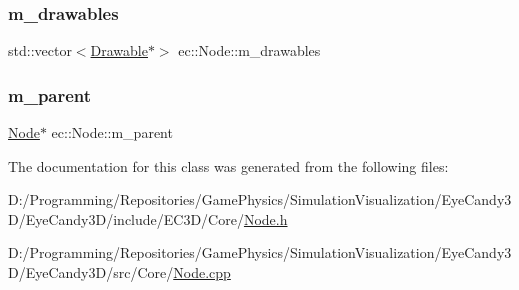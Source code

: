 \mbox{\label{classec_1_1_node_aa9f624971a4906674148117ba4442c01}} 
\subsubsection{\texorpdfstring{m\+\_\+drawables}{m\_drawables}}
{\footnotesize\ttfamily std\+::vector$<$\mbox{\hyperlink{classec_1_1_drawable}{Drawable}}$\ast$$>$ ec\+::\+Node\+::m\+\_\+drawables\hspace{0.3cm}{\ttfamily [protected]}}

\mbox{\label{classec_1_1_node_a9f5373bd3ba5bfed53894223adcfe791}} 
\subsubsection{\texorpdfstring{m\+\_\+parent}{m\_parent}}
{\footnotesize\ttfamily \mbox{\hyperlink{classec_1_1_node}{Node}}$\ast$ ec\+::\+Node\+::m\+\_\+parent\hspace{0.3cm}{\ttfamily [protected]}}



The documentation for this class was generated from the following files\+:\begin{DoxyCompactItemize}
\item 
D\+:/\+Programming/\+Repositories/\+Game\+Physics/\+Simulation\+Visualization/\+Eye\+Candy3\+D/\+Eye\+Candy3\+D/include/\+E\+C3\+D/\+Core/\mbox{\hyperlink{_node_8h}{Node.\+h}}\item 
D\+:/\+Programming/\+Repositories/\+Game\+Physics/\+Simulation\+Visualization/\+Eye\+Candy3\+D/\+Eye\+Candy3\+D/src/\+Core/\mbox{\hyperlink{_node_8cpp}{Node.\+cpp}}\end{DoxyCompactItemize}
